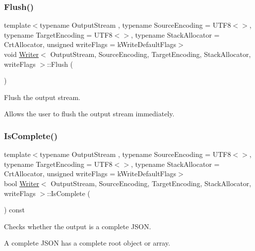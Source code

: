 \subsubsection{\texorpdfstring{Flush()}{Flush()}}
{\footnotesize\ttfamily template$<$typename Output\+Stream , typename Source\+Encoding  = U\+T\+F8$<$$>$, typename Target\+Encoding  = U\+T\+F8$<$$>$, typename Stack\+Allocator  = Crt\+Allocator, unsigned write\+Flags = k\+Write\+Default\+Flags$>$ \\
void \hyperlink{a02224}{Writer}$<$ Output\+Stream, Source\+Encoding, Target\+Encoding, Stack\+Allocator, write\+Flags $>$\+::Flush (\begin{DoxyParamCaption}{ }\end{DoxyParamCaption})\hspace{0.3cm}{\ttfamily [inline]}}



Flush the output stream. 

Allows the user to flush the output stream immediately. \mbox{\label{a02224_a07d74d36dd3191b06e0aab678c246157}} 
\subsubsection{\texorpdfstring{Is\+Complete()}{IsComplete()}}
{\footnotesize\ttfamily template$<$typename Output\+Stream , typename Source\+Encoding  = U\+T\+F8$<$$>$, typename Target\+Encoding  = U\+T\+F8$<$$>$, typename Stack\+Allocator  = Crt\+Allocator, unsigned write\+Flags = k\+Write\+Default\+Flags$>$ \\
bool \hyperlink{a02224}{Writer}$<$ Output\+Stream, Source\+Encoding, Target\+Encoding, Stack\+Allocator, write\+Flags $>$\+::Is\+Complete (\begin{DoxyParamCaption}{ }\end{DoxyParamCaption}) const\hspace{0.3cm}{\ttfamily [inline]}}



Checks whether the output is a complete J\+S\+ON. 

A complete J\+S\+ON has a complete root object or array. \mbox{\label{a02224_ae0d1615104e4e88040b9640e6784008a}} 
